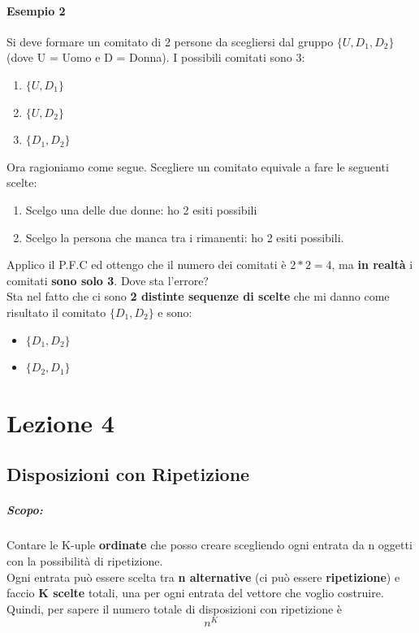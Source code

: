 \documentclass{report}
\begin{document}
\subsubsection{Esempio 2}
Si deve formare un comitato di 2 persone da scegliersi dal gruppo \(\{U, D_1, D_2\}\) (dove U = Uomo e D = Donna). I possibili comitati sono 3: \begin{enumerate}
    \item \(\{U, D_1\}\)
    \item \(\{U, D_2\}\)
    \item \(\{D_1, D_2\}\)
\end{enumerate}
Ora ragioniamo come segue. Scegliere un comitato equivale a fare le seguenti scelte: \begin{enumerate}
    \item Scelgo una delle due donne: ho 2 esiti possibili
    \item Scelgo la persona che manca tra i rimanenti: ho 2 esiti possibili.
\end{enumerate}
Applico il P.F.C ed ottengo che il numero dei comitati è \(2*2 = 4\), ma \textbf{in realtà} i comitati \textbf{sono solo 3}. Dove sta l'errore?\\
Sta nel fatto che ci sono \textbf{2 distinte sequenze di scelte} che mi danno come risultato il comitato \(\{D_1, D_2\}\) e sono: \begin{itemize}
    \item \(\{D_1, D_2\}\)
    \item \(\{D_2, D_1\}\)
\end{itemize}
\chapter{Lezione 4}
\section{Disposizioni con Ripetizione}
\paragraph{Scopo:} Contare le K-uple \textbf{ordinate} che posso creare scegliendo ogni entrata da n oggetti con la possibilità di ripetizione.\\
Ogni entrata può essere scelta tra \textbf{n alternative} (ci può essere \textbf{ripetizione}) e faccio \textbf{K scelte} totali, una per ogni entrata del vettore che voglio costruire. Quindi, per sapere il numero totale di disposizioni con ripetizione è \[n^K\]
\end{document}
